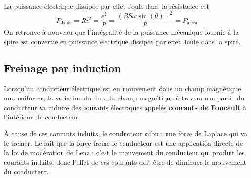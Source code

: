 \documentclass{cours}
\begin{document}
La puissance électrique dissipée par effet Joule dans la résistance est 
\begin{equation}
  P_\text{Joule}= Ri^2 = \frac{e^2}{R}=\frac{(BS\omega\sin(\theta))^2}{R} = P_\text{meca}
\end{equation}
On retrouve à nouveau que l'intégralité de la puissance mécanique fournie à la spire est convertie en puissance électrique dissipée par effet Joule dans la spire.

\subsection{Freinage par induction}%
\label{sub:freinage_par_induction}

Lorsqu'un conducteur électrique est en mouvement dans un champ magnétique non uniforme, la variation du flux du champ magnétique à travers une partie du conducteur va induire des courants électriques appelés \textbf{courants de Foucault} à l'intérieur du conducteur. 

À cause de ces courants induits, le conducteur subira une force de Laplace qui va le freiner. Le fait que la force freine le conducteur est une application directe de la loi de modération de Lenz : c'est le mouvement du conducteur qui produit les courants induits, donc l'effet de ces courants doit être de diminuer le mouvement du conducteur.
\end{document}
